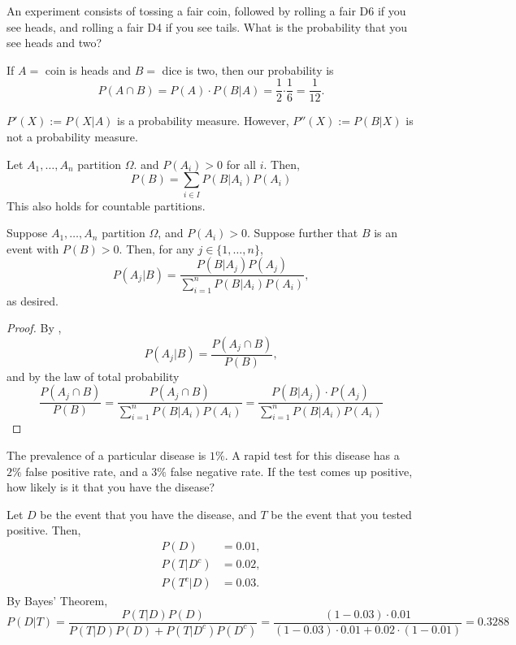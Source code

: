 \documentclass[11pt]{article}
\begin{document}
\begin{ex}
    An experiment consists of tossing a fair coin, followed by rolling a fair D6 if you see heads, and rolling a fair D4 if you see tails. What is the probability that you see heads and two?

    If $A=$ coin is heads and $B=$ dice is two, then our probability is
    $$P(A\cap B)=P(A)\cdot P(B|A) = \frac{1}2{\cdot \frac{1}{6}}=\frac{1}{12}.$$
\end{ex}

\begin{thm}
    $P'(X):=P(X|A)$ is a probability measure. However, $P''(X):=P(B|X)$ is not a probability measure.
\end{thm}

\begin{thm}
    Let $A_1,\dots,A_n$ partition $\Omega$. and $P(A_i)>0$ for all $i$. Then,
    $$P(B) = \sum_{i\in I}P(B|A_i)P(A_i)$$
    This also holds for countable partitions.
\end{thm}

\begin{thm}
    Suppose $A_1,\dots,A_n$ partition $\Omega$, and $P(A_i)>0$. Suppose further that $B$ is an event with $P(B)>0$. Then, for any $j\in\{1,\dots,n\}$,
    $$P(A_j|B) = \frac{P(B|A_j)P(A_j)}{\sum_{i=1}^nP(B|A_i)P(A_i)},$$
    as desired.
\end{thm}

\begin{proof}
    By ,
    $$P(A_j|B) = \frac{P(A_j \cap B)}{P(B)},$$
    and by the law of total probability
    $$\frac{P(A_j \cap B)}{P(B)}=\frac{P(A_j \cap B)}{\sum_{i=1}^nP(B|A_i)P(A_i)}=\frac{P(B|A_j)\cdot P(A_j)}{\sum_{i=1}^nP(B|A_i)P(A_i)}$$
\end{proof}

\begin{ex}
    The prevalence of a particular disease is $1\%$. A rapid test for this disease has a $2\%$ false positive rate, and a $3\%$ false negative rate. If the test comes up positive, how likely is it that you have the disease?
\end{ex}

\begin{solution}
Let $D$ be the event that you have the disease, and $T$ be the event that you tested positive. Then,
\begin{align*}
    P(D) &= 0.01,
    \\ P(T |D^c)&=0.02,
    \\ P(T^c|D) &= 0.03.
\end{align*}
By Bayes' Theorem,
$$P(D|T) = \frac{P(T|D)P(D)}{P(T|D)P(D) + P(T|D^c)P(D^c)}=\frac{(1-0.03)\cdot 0.01}{(1-0.03)\cdot 0.01 + 0.02\cdot (1-0.01)}=0.3288$$
\end{solution}
\end{document}
